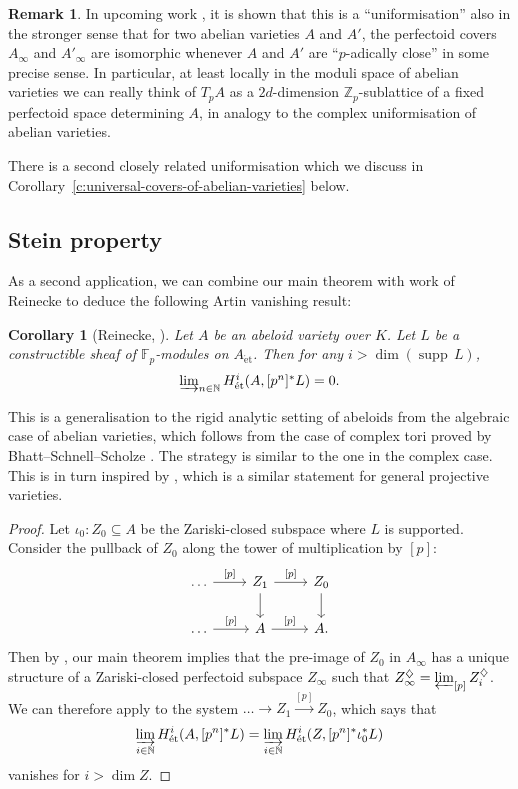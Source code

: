 \documentclass[10pt,oneside]{amsart}
\newtheorem{corollary}[theorem]{Corollary}
\theoremstyle{definition}
\newtheorem{remark}[theorem]{Remark}
\newcommand{\supp}{{\operatorname{supp}\,}}
\newcommand{\et}{\operatorname{\acute{e}t}}
\newcommand{\N}{\mathbb{N}}
\begin{document}
	\begin{remark}
	In upcoming work \cite{heuer-isoclasses}, it is shown that this is a  ``uniformisation'' also in the stronger sense that for two abelian varieties $A$ and $A'$, the perfectoid covers $A_\infty$ and $A'_\infty$ are isomorphic whenever $A$ and $A'$ are ``$p$-adically close'' in some precise sense. In particular, at least locally in the moduli space of abelian varieties we can really think of $T_pA$ as a $2d$-dimension $\mathbb Z_p$-sublattice of a fixed perfectoid space determining $A$, in analogy to the complex uniformisation of abelian varieties.
	\end{remark}
	 There is a second closely related uniformisation which we discuss in Corollary~\ref{c:universal-covers-of-abelian-varieties} below.
	\subsection{Stein property}
	As a second application, we can combine our main theorem with work of Reinecke to deduce the following Artin vanishing result:
	\begin{corollary}[{Reinecke, \cite[Theorem~3.3]{Reinecke}}]
		Let $A$ be an abeloid variety over $K$. Let $L$ be a constructible sheaf of $\mathbb F_p$-modules on $A_{\et}$. Then for any $i>\dim(\supp L)$,
		\[\textstyle\varinjlim_{n\in \mathbb N}H_{\et}^i(A,[p^n]^{\ast}L)=0.\]
	\end{corollary}
	This is a generalisation to the rigid analytic setting of abeloids from the algebraic case of abelian varieties, which follows from the case of complex tori proved by Bhatt--Schnell--Scholze \cite[Corollary~1.2]{BSS_VanishingTheorems}. The strategy is similar to the one in the complex case. This is in turn inspired by \cite[Theorem~17.3]{PerfectoidApplications}, which is a similar statement for general projective varieties.
	\begin{proof}
		Let $\iota_0:Z_0\subseteq A$ be the Zariski-closed subspace where $L$ is supported. Consider the pullback of $Z_0$ along the tower of multiplication by $[p]$:
		\[
		\begin{tikzcd}
			\dots \arrow[r, "{[p]}"] & Z_1 \arrow[d] \arrow[r, "{[p]}"] & Z_0 \arrow[d] \\
			\dots \arrow[r, "{[p]}"] & A \arrow[r, "{[p]}"]             & A.            
		\end{tikzcd}\]
	Then by \cite[Lemma II.2.2]{torsion}, our main theorem implies that the pre-image of $Z_0$ in $A_\infty$ has a unique structure of a Zariski-closed perfectoid subspace $Z_\infty$ such that $Z_\infty^{\diamondsuit}=\varprojlim_{[p]} Z_i^{\diamondsuit}$. We can therefore apply \cite[Theorem~3.3]{Reinecke} to the system $\dots \rightarrow Z_1\xrightarrow{[p]}Z_0$, which says that
	\[ \varinjlim_{i\in \N}H^i_{\et}(A,[p^n]^{\ast}L)=\varinjlim_{i\in \N}H^i_{\et}(Z,[p^n]^{\ast}\iota_0^{\ast}L)\]
	vanishes for $i>\dim Z$.
	\end{proof}
\end{document}
